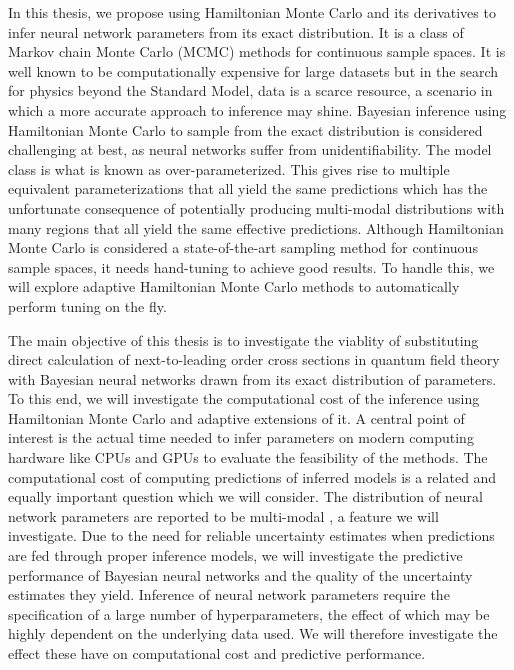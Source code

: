 In this thesis, we propose using Hamiltonian Monte Carlo and its derivatives to infer neural network parameters from its exact distribution. It is a class of Markov chain Monte Carlo (MCMC) methods for continuous sample spaces. It is well known to be computationally expensive for large datasets but in the search for physics beyond the Standard Model, data is a scarce resource, a scenario in which a more accurate approach to inference may shine. Bayesian inference using Hamiltonian Monte Carlo to sample from the exact distribution is considered challenging at best, as neural networks suffer from unidentifiability. The model class is what is known as over-parameterized. This gives rise to multiple equivalent parameterizations that all yield the same predictions which has the unfortunate consequence of potentially producing multi-modal distributions with many regions that all yield the same effective predictions. Although Hamiltonian Monte Carlo is considered a state-of-the-art sampling method for continuous sample spaces, it needs hand-tuning to achieve good results. To handle this, we will explore adaptive Hamiltonian Monte Carlo methods to automatically perform tuning on the fly.

The main objective of this thesis is to investigate the viablity of substituting direct calculation of next-to-leading order cross sections in quantum field theory with Bayesian neural networks drawn from its exact distribution of parameters.
To this end, we will investigate the computational cost of the inference using Hamiltonian Monte Carlo and adaptive extensions of it. A central point of interest is the actual time needed to infer parameters on modern computing hardware like CPUs and GPUs to evaluate the feasibility of the methods. The computational cost of computing predictions of inferred models is a related and equally important question which we will consider. The distribution of neural network parameters are reported to be multi-modal \cite{google_bnn_posteriors}, a feature we will investigate. Due to the need for reliable uncertainty estimates when predictions are fed through proper inference models, we will investigate the predictive performance of Bayesian neural networks and the quality of the uncertainty estimates they yield. Inference of neural network parameters require the specification of a large number of hyperparameters, the effect of which may be highly dependent on the underlying data used. We will therefore investigate the effect these have on computational cost and predictive performance.

